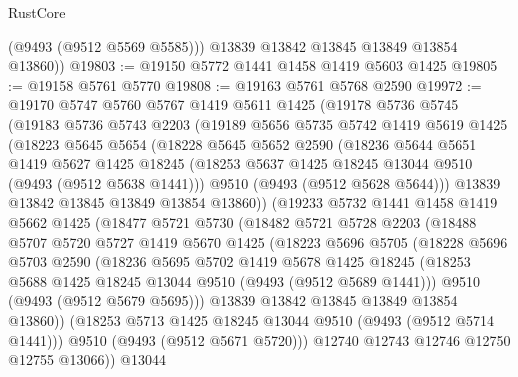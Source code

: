 \begin{lexlean}{RustCore}
\begin{coremodule}
          (@9493 (@9512 @5569 @5585)))
        @13839
        @13842
        @13845
        @13849
        @13854
        @13860))
@19803 := @19150 @5772 @1441 @1458 @1419 @5603 @1425
@19805 := @19158 @5761 @5770
@19808 := @19163 @5761 @5768 @2590
@19972 := @19170
    @5747
    @5760
    @5767
    @1419
    @5611
    @1425
    (@19178
      @5736
      @5745
      (@19183
        @5736
        @5743
        @2203
        (@19189
          @5656
          @5735
          @5742
          @1419
          @5619
          @1425
          (@18223
            @5645
            @5654
            (@18228
              @5645
              @5652
              @2590
              (@18236
                @5644
                @5651
                @1419
                @5627
                @1425
                @18245
                (@18253 @5637 @1425 @18245 @13044 @9510 (@9493 (@9512 @5638 @1441)))
                @9510
                (@9493 (@9512 @5628 @5644)))
              @13839
              @13842
              @13845
              @13849
              @13854
              @13860))
          (@19233
            @5732
            @1441
            @1458
            @1419
            @5662
            @1425
            (@18477
              @5721
              @5730
              (@18482
                @5721
                @5728
                @2203
                (@18488
                  @5707
                  @5720
                  @5727
                  @1419
                  @5670
                  @1425
                  (@18223
                    @5696
                    @5705
                    (@18228
                      @5696
                      @5703
                      @2590
                      (@18236
                        @5695
                        @5702
                        @1419
                        @5678
                        @1425
                        @18245
                        (@18253 @5688 @1425 @18245 @13044 @9510 (@9493 (@9512 @5689 @1441)))
                        @9510
                        (@9493 (@9512 @5679 @5695)))
                      @13839
                      @13842
                      @13845
                      @13849
                      @13854
                      @13860))
                  (@18253 @5713 @1425 @18245 @13044 @9510 (@9493 (@9512 @5714 @1441)))
                  @9510
                  (@9493 (@9512 @5671 @5720)))
                @12740
                @12743
                @12746
                @12750
                @12755
                @13066))
            @13044

\end{coremodule}
\end{lexlean}
